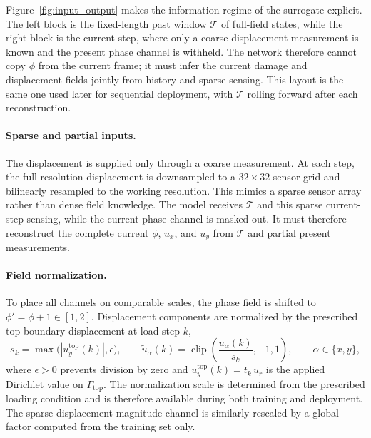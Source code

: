 \documentclass[10pt]{article}
\theoremstyle{definition}
\begin{document}
Figure~\ref{fig:input_output} makes the information regime of the surrogate explicit.
%
The left block is the fixed-length past window $\mathcal{T}$ of full-field states, while the right block is the current step, where only a coarse displacement measurement is known and the present phase channel is withheld.
%
The network therefore cannot copy $\phi$ from the current frame; it must infer the current damage and displacement fields jointly from history and sparse sensing.
%
This layout is the same one used later for sequential deployment, with $\mathcal{T}$ rolling forward after each reconstruction.

\paragraph{Sparse and partial inputs.}
The displacement is supplied only through a coarse measurement.
%
At each step, the full-resolution displacement is downsampled to a $32\times32$ sensor grid and bilinearly resampled to the working resolution.
%
This mimics a sparse sensor array rather than dense field knowledge.
%
The model receives $\mathcal{T}$ and this sparse current-step sensing, while the current phase channel is masked out.
%
It must therefore reconstruct the complete current $\phi$, $u_x$, and $u_y$ from $\mathcal{T}$ and partial present measurements.

\paragraph{Field normalization.}
To place all channels on comparable scales, the phase field is shifted to $\phi' = \phi + 1 \in [1,2]$. Displacement components are normalized by the prescribed top-boundary displacement at load step $k$,
%
\begin{equation}
    s_k=\max\!\bigl(|u_y^{\mathrm{top}}(k)|,\epsilon\bigr),
    \qquad
    \widetilde{u}_{\alpha}(k)
    =
    \operatorname{clip}\!\left(\frac{u_\alpha(k)}{s_k},-1,1\right),
    \qquad \alpha\in\{x,y\},
    \label{eq:disp_norm}
\end{equation}
%
where $\epsilon>0$ prevents division by zero and $u_y^{\mathrm{top}}(k)=t_k\,u_r$ is the applied Dirichlet value on $\Gamma_{\mathrm{top}}$.
%
The normalization scale is determined from the prescribed loading condition and is therefore available during both training and deployment.
%
The sparse displacement-magnitude channel is similarly rescaled by a global factor computed from the training set only.
\end{document}
